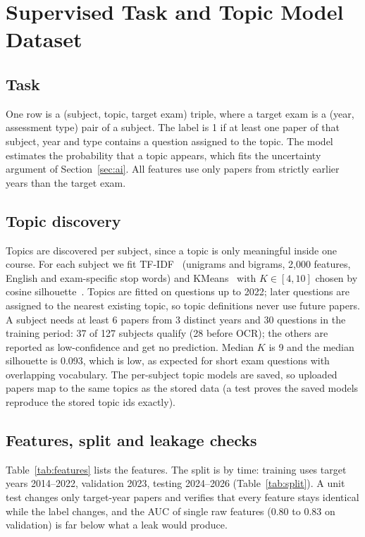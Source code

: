 \documentclass[11pt,a4paper]{article}
\begin{document}
\section{Supervised Task and Topic Model Dataset}
\label{sec:task}

\subsection{Task}
One row is a (subject, topic, target exam) triple, where a target exam is a (year, assessment type) pair of a subject. The
label is 1 if at least one paper of that subject, year and type contains a question assigned to the topic. The model
estimates the probability that a topic appears, which fits the uncertainty argument of Section~\ref{sec:ai}. All features
use only papers from strictly earlier years than the target exam.

\subsection{Topic discovery}
Topics are discovered per subject, since a topic is only meaningful inside one course. For each subject we fit TF-IDF~\cite{tfidf}
(unigrams and bigrams, 2{,}000 features, English and exam-specific stop words) and KMeans~\cite{kmeans} with $K \in [4,10]$ chosen by
cosine silhouette~\cite{silhouette}. Topics are fitted on questions up to 2022; later questions are assigned to the nearest existing topic, so
topic definitions never use future papers. A subject needs at least 6 papers from 3 distinct years and 30 questions in the
training period: 37 of 127 subjects qualify (28 before OCR); the others are reported as low-confidence and get no prediction.
Median $K$ is 9 and the median silhouette is 0.093, which is low, as expected for short exam questions with overlapping
vocabulary. The per-subject topic models are saved, so uploaded papers map to the same topics as the stored data (a test
proves the saved models reproduce the stored topic ids exactly).

\subsection{Features, split and leakage checks}
Table~\ref{tab:features} lists the features. The split is by time: training uses target years 2014--2022, validation 2023,
testing 2024--2026 (Table~\ref{tab:split}). A unit test changes only target-year papers and verifies that every feature stays
identical while the label changes, and the AUC of single raw features (0.80 to 0.83 on validation) is far below what a leak
would produce.
\end{document}
